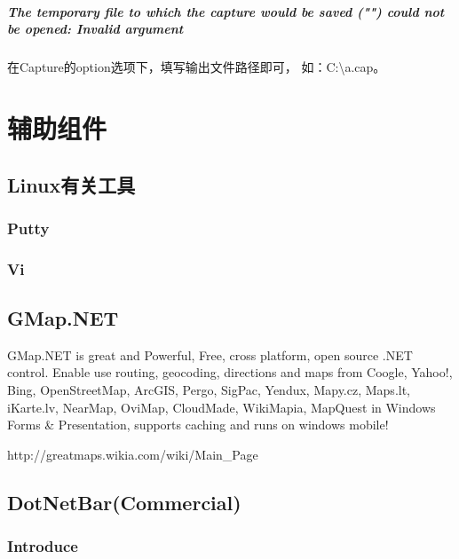 \documentclass{book}
\begin{document}
\paragraph{The temporary file to which the capture would be saved ("") could not be opened: Invalid argument}

在Capture的option选项下，填写输出文件路径即可，
如：C:\textbackslash a.cap。


\chapter{辅助组件}

\clearpage

\section{Linux有关工具}






\subsection{Putty}

\subsection{Vi}

\section{GMap.NET}

GMap.NET is great and Powerful, Free, cross platform, open source .NET control. 
Enable use routing, geocoding, directions and maps from Coogle, Yahoo!, 
Bing, OpenStreetMap, ArcGIS, Pergo, SigPac, Yendux, Mapy.cz, 
Maps.lt, iKarte.lv, NearMap, OviMap, CloudMade, WikiMapia, 
MapQuest in Windows Forms \& Presentation, supports caching and runs on windows mobile!

http://greatmaps.wikia.com/wiki/Main\_Page

\section{DotNetBar(Commercial)}

\subsection{Introduce}
\end{document}
